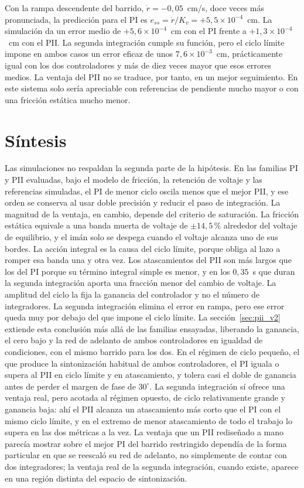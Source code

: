 Con la rampa descendente del barrido, $\dot r=-0{,}05$~cm/s, doce veces más pronunciada, la predicción para el PI es $e_{ss}=\dot r/K_v=+5{,}5\times10^{-4}$~cm. La simulación da un error medio de $+5{,}6\times10^{-4}$~cm con el PI frente a $+1{,}3\times10^{-4}$~cm con el PII. La segunda integración cumple su función, pero el ciclo límite impone en ambos casos un error eficaz de unos $7{,}6\times10^{-3}$~cm, prácticamente igual con los dos controladores y más de diez veces mayor que esos errores medios. La ventaja del PII no se traduce, por tanto, en un mejor seguimiento. En este sistema solo sería apreciable con referencias de pendiente mucho mayor o con una fricción estática mucho menor.

\section{Síntesis}\label{sec:sintesis_doble_integral}

Las simulaciones no respaldan la segunda parte de la hipótesis. En las familias PI y PII evaluadas, bajo el modelo de fricción, la retención de voltaje y las referencias simuladas, el PI de menor ciclo oscila menos que el mejor PII, y ese orden se conserva al usar doble precisión y reducir el paso de integración. La magnitud de la ventaja, en cambio, depende del criterio de saturación. La fricción estática equivale a una banda muerta de voltaje de $\pm14{,}5$\,\% alrededor del voltaje de equilibrio, y el imán solo se despega cuando el voltaje alcanza uno de sus bordes. La acción integral es la causa del ciclo límite, porque obliga al lazo a romper esa banda una y otra vez. Los atascamientos del PII son más largos que los del PI porque su término integral simple es menor, y en los $0{,}35$~s que duran la segunda integración aporta una fracción menor del cambio de voltaje. La amplitud del ciclo la fija la ganancia del controlador y no el número de integradores. La segunda integración elimina el error en rampa, pero ese error queda muy por debajo del que impone el ciclo límite. La sección~\ref{sec:pii_v2} extiende esta conclusión más allá de las familias ensayadas, liberando la ganancia, el cero bajo y la red de adelanto de ambos controladores en igualdad de condiciones, con el mismo barrido para los dos. En el régimen de ciclo pequeño, el que produce la sintonización habitual de ambos controladores, el PI iguala o supera al PII en ciclo límite y en atascamiento, y tolera casi el doble de ganancia antes de perder el margen de fase de $30^\circ$. La segunda integración sí ofrece una ventaja real, pero acotada al régimen opuesto, de ciclo relativamente grande y ganancia baja: ahí el PII alcanza un atascamiento más corto que el PI con el mismo ciclo límite, y en el extremo de menor atascamiento de todo el trabajo lo supera en las dos métricas a la vez. La ventaja que un PII rediseñado a mano parecía mostrar sobre el mejor PI del barrido restringido dependía de la forma particular en que se reescaló su red de adelanto, no simplemente de contar con dos integradores; la ventaja real de la segunda integración, cuando existe, aparece en una región distinta del espacio de sintonización.

